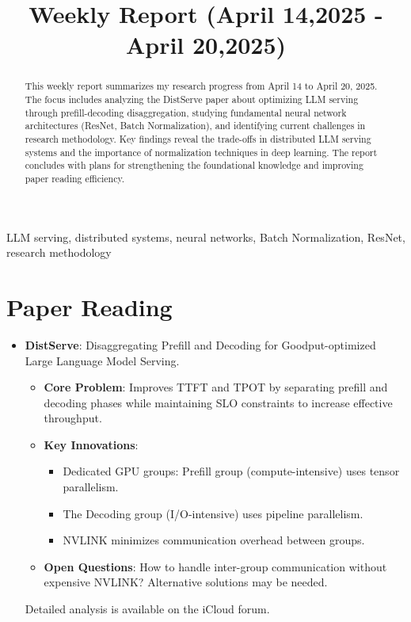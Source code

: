 \documentclass[conference]{IEEEtran}
\begin{document}
\title{Weekly Report (April 14,2025 - April 20,2025)}
\author{
}

\maketitle

\begin{abstract}
This weekly report summarizes my research progress from April 14 to April 20, 2025. The focus includes analyzing the DistServe paper about optimizing LLM serving through prefill-decoding disaggregation, studying fundamental neural network architectures (ResNet, Batch Normalization), and identifying current challenges in research methodology. Key findings reveal the trade-offs in distributed LLM serving systems and the importance of normalization techniques in deep learning. The report concludes with plans for strengthening the foundational knowledge and improving paper reading efficiency.
\end{abstract}
\begin{IEEEkeywords}
LLM serving, distributed systems, neural networks, Batch Normalization, ResNet, research methodology
\end{IEEEkeywords}

\section{Paper Reading}
\begin{itemize}[leftmargin=*,noitemsep]
    \item \textbf{DistServe}: Disaggregating Prefill and Decoding for Goodput-optimized Large Language Model Serving.
    \begin{itemize}[leftmargin=*]
        \item \textbf{Core Problem}: Improves TTFT and TPOT by separating prefill and decoding phases while maintaining SLO constraints to increase effective throughput.
        \item \textbf{Key Innovations}:
        \begin{itemize}[leftmargin=*]
            \item Dedicated GPU groups: Prefill group (compute-intensive) uses tensor parallelism.
            \item The Decoding group (I/O-intensive) uses pipeline parallelism.
            \item NVLINK minimizes communication overhead between groups.
        \end{itemize}
        \item \textbf{Open Questions}: How to handle inter-group communication without expensive NVLINK? Alternative solutions may be needed.
    \end{itemize}
    Detailed analysis is available on the iCloud forum.
\end{itemize}
\end{document}

